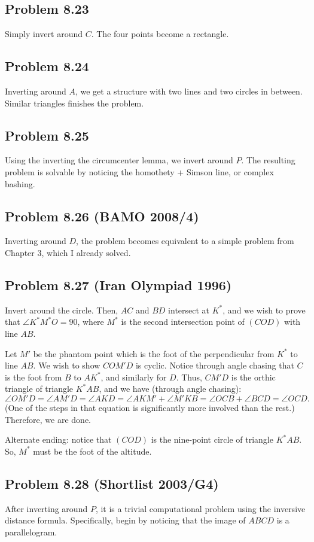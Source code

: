 \documentclass{scrartcl}
\begin{document}
\subsection*{Problem 8.23}
Simply invert around $C$. The four points become a rectangle.

\subsection*{Problem 8.24}
Inverting around $A$, we get a structure with two lines and two circles in between. Similar triangles finishes the problem.

\subsection*{Problem 8.25}
Using the inverting the circumcenter lemma, we invert around $P$. The resulting problem is solvable by noticing
the homothety + Simson line, or complex bashing.

\subsection*{Problem 8.26 (BAMO 2008/4)}
Inverting around $D$, the problem becomes equivalent to a simple problem from Chapter 3, which I already solved.

\subsection*{Problem 8.27 (Iran Olympiad 1996)}
Invert around the circle. Then, $AC$ and $BD$ intersect at $K^*$, and we wish to prove that $\angle K^*M^*O = 90$,
where $M^*$ is the second intersection point of $(COD)$ with line $AB$.

Let $M'$ be the phantom point which is the foot of the perpendicular from $K^*$ to line $AB$. We wish to show
$COM'D$ is cyclic. Notice through angle chasing that $C$ is the foot from $B$ to $AK^*$, and similarly for $D$.
Thus, $CM'D$ is the orthic triangle of triangle $K^*AB$, and we have (through angle chasing):
\[ \angle OM'D = \angle AM'D = \angle AKD = \angle AKM' + \angle M'KB = \angle OCB + \angle BCD = \angle OCD. \]
(One of the steps in that equation is significantly more involved than the rest.) Therefore, we are done.

Alternate ending: notice that $(COD)$ is the nine-point circle of triangle $K^*AB$. So, $M^*$ must be the foot of
the altitude.

\subsection*{Problem 8.28 (Shortlist 2003/G4)}
After inverting around $P$, it is a trivial computational problem using the inversive distance formula. Specifically,
begin by noticing that the image of $ABCD$ is a parallelogram.
\end{document}
